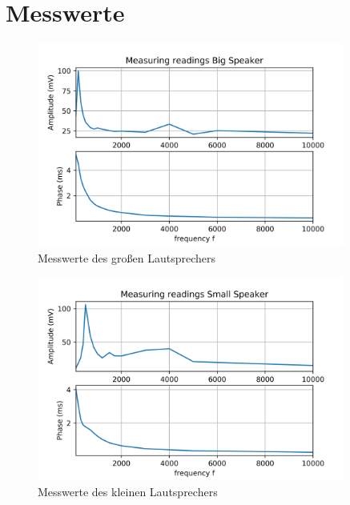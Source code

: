 \documentclass[12pt, oneside, a4paper, \docLanguage]{report}
\begin{document}
\section{Messwerte}
\label{chap:VERSUCH_2_MESSWERTE}
\begin{normalsize}
\begin{figure}[H]
\includegraphics[width=0.9\textwidth]{../MeasurementPlotBigSpeaker.png}
\caption{Messwerte des großen Lautsprechers}
\end{figure}
\begin{figure}[H]
\includegraphics[width=0.9\textwidth]{../MeasurementPlotSmallSpeaker.png}
\caption{Messwerte des kleinen Lautsprechers}
\end{figure}
\end{normalsize}
\end{document}
